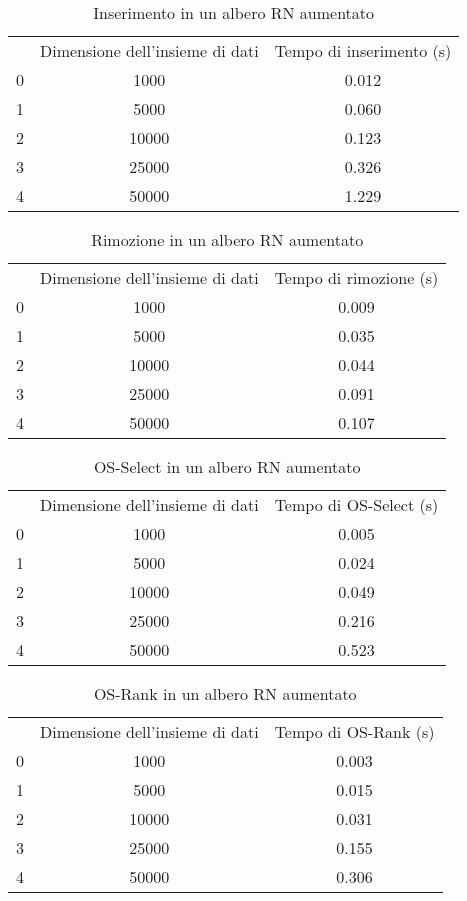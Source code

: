 \begin{table}
\centering
\caption{Inserimento in un albero RN aumentato}
\label{Inserimento in un albero RN aumentato}
\begin{tabular}{ccc}
 & Dimensione dell'insieme di dati & Tempo di inserimento (s) \\
0 & 1000 & 0.012 \\
\cline{1-3}
1 & 5000 & 0.060 \\
\cline{1-3}
2 & 10000 & 0.123 \\
\cline{1-3}
3 & 25000 & 0.326 \\
\cline{1-3}
4 & 50000 & 1.229 \\
\cline{1-3}
\end{tabular}
\end{table}

\begin{table}
\centering
\caption{Rimozione in un albero RN aumentato}
\label{Rimozione in un albero RN aumentato}
\begin{tabular}{ccc}
 & Dimensione dell'insieme di dati & Tempo di rimozione (s) \\
0 & 1000 & 0.009 \\
\cline{1-3}
1 & 5000 & 0.035 \\
\cline{1-3}
2 & 10000 & 0.044 \\
\cline{1-3}
3 & 25000 & 0.091 \\
\cline{1-3}
4 & 50000 & 0.107 \\
\cline{1-3}
\end{tabular}
\end{table}

\begin{table}
\centering
\caption{OS-Select in un albero RN aumentato}
\label{OS-Select in un albero RN aumentato}
\begin{tabular}{ccc}
 & Dimensione dell'insieme di dati & Tempo di OS-Select (s) \\
0 & 1000 & 0.005 \\
\cline{1-3}
1 & 5000 & 0.024 \\
\cline{1-3}
2 & 10000 & 0.049 \\
\cline{1-3}
3 & 25000 & 0.216 \\
\cline{1-3}
4 & 50000 & 0.523 \\
\cline{1-3}
\end{tabular}
\end{table}

\begin{table}
\centering
\caption{OS-Rank in un albero RN aumentato}
\label{OS-Rank in un albero RN aumentato}
\begin{tabular}{ccc}
 & Dimensione dell'insieme di dati & Tempo di OS-Rank (s) \\
0 & 1000 & 0.003 \\
\cline{1-3}
1 & 5000 & 0.015 \\
\cline{1-3}
2 & 10000 & 0.031 \\
\cline{1-3}
3 & 25000 & 0.155 \\
\cline{1-3}
4 & 50000 & 0.306 \\
\cline{1-3}
\end{tabular}
\end{table}
